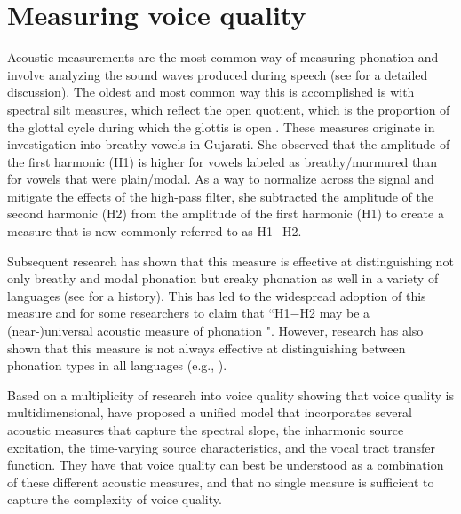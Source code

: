\section{Measuring voice quality} \label{sec:measuring_voice_quality}

Acoustic measurements are the most common way of measuring phonation and involve analyzing the sound waves produced during speech (see \cite{garellekPhoneticsVoice2019} for a detailed discussion). The oldest and most common way this is accomplished is with spectral silt measures, which reflect the open quotient, which is the proportion of the glottal cycle during which the glottis is open \citep{holmbergComparisonsAerodynamicElectroglottographic1995}. These measures originate in  investigation into breathy vowels in Gujarati. She observed that the amplitude of the first harmonic (H1) is higher for vowels labeled as breathy/murmured than for vowels that were plain/modal. As a way to normalize across the signal and mitigate the effects of the high-pass filter, she subtracted the amplitude of the second harmonic (H2) from the amplitude of the first harmonic (H1) to create a measure that is now commonly referred to as H1$-$H2. 

Subsequent research has shown that this measure is effective at distinguishing not only breathy and modal phonation but creaky phonation as well in a variety of languages (see \cite{garellekTheoreticalAchievementsPhonetics2022} for a history). This has led to the widespread adoption of this measure and for some researchers to claim that ``H1$-$H2 may be a (near-)universal acoustic measure of phonation \citep[8]{espositoCrosslinguisticPatternsPhonation2020}". However, research has also shown that this measure is not always effective at distinguishing between phonation types in all languages (e.g., \cite{brinkerhoffUsingResidualH12025,chaiH1H2AcousticMeasure2022,espositoVariationContrastivePhonation2010,simpsonFirstSecondHarmonics2012}). 

Based on a multiplicity of research into voice quality showing that voice quality is multidimensional, \citet{kreimanUnifiedTheoryVoice2014,kreimanValidatingPsychoacousticModel2021} have proposed a unified model that incorporates several acoustic measures that capture the spectral slope, the inharmonic source excitation, the time-varying source characteristics, and the vocal tract transfer function. They have that voice quality can best be understood as a combination of these different acoustic measures, and that no single measure is sufficient to capture the complexity of voice quality.




